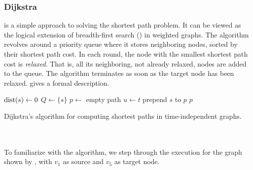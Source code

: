 \subsubsection{Dijkstra}
	\dijkstra {} is a simple approach to solving the shortest path problem. It can be viewed
	as the logical extension of breadth-first search (\bfs)  in weighted graphs. The algorithm
	revolves around a priority queue where it stores neighboring nodes, sorted by their shortest path cost.
	In each round, the node with the smallest shortest path cost is \textit{relaxed}. That is, all its neighboring,
	not already relaxed, nodes are added to the queue. The algorithm terminates as soon as the target node has been relaxed.
	 gives a formal description.
	\IncMargin{1em}
	\begin{algorithm}
		\BlankLine
		\BlankLine
		\BlankLine
		$\operatorname{dist}(s) \leftarrow 0$\;
		$Q \leftarrow \{s\}$\;
		\BlankLine
		\BlankLine
		$p \leftarrow$ empty path\;
		$u \leftarrow t$\;
		prepend $s$ to $p$\;
		\Return $p$\;
		\BlankLine
		\caption{Dijkstra's algorithm for computing shortest paths in time-independent graphs.}\label{dijkstra}
	\end{algorithm}\DecMargin{1em}\quad\\\\
	To familiarize with the algorithm, we step through the execution for the graph shown by ,
	with $v_1$ as source and $v_5$ as target node.
	
